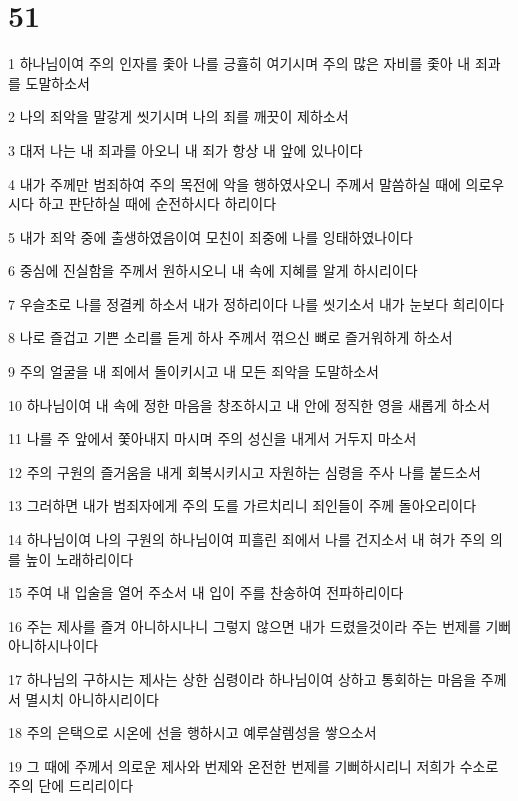 \chapter{51}

\par 1 하나님이여 주의 인자를 좇아 나를 긍휼히 여기시며 주의 많은 자비를 좇아 내 죄과를 도말하소서
\par 2 나의 죄악을 말갛게 씻기시며 나의 죄를 깨끗이 제하소서
\par 3 대저 나는 내 죄과를 아오니 내 죄가 항상 내 앞에 있나이다
\par 4 내가 주께만 범죄하여 주의 목전에 악을 행하였사오니 주께서 말씀하실 때에 의로우시다 하고 판단하실 때에 순전하시다 하리이다
\par 5 내가 죄악 중에 출생하였음이여 모친이 죄중에 나를 잉태하였나이다
\par 6 중심에 진실함을 주께서 원하시오니 내 속에 지혜를 알게 하시리이다
\par 7 우슬초로 나를 정결케 하소서 내가 정하리이다 나를 씻기소서 내가 눈보다 희리이다
\par 8 나로 즐겁고 기쁜 소리를 듣게 하사 주께서 꺾으신 뼈로 즐거워하게 하소서
\par 9 주의 얼굴을 내 죄에서 돌이키시고 내 모든 죄악을 도말하소서
\par 10 하나님이여 내 속에 정한 마음을 창조하시고 내 안에 정직한 영을 새롭게 하소서
\par 11 나를 주 앞에서 쫓아내지 마시며 주의 성신을 내게서 거두지 마소서
\par 12 주의 구원의 즐거움을 내게 회복시키시고 자원하는 심령을 주사 나를 붙드소서
\par 13 그러하면 내가 범죄자에게 주의 도를 가르치리니 죄인들이 주께 돌아오리이다
\par 14 하나님이여 나의 구원의 하나님이여 피흘린 죄에서 나를 건지소서 내 혀가 주의 의를 높이 노래하리이다
\par 15 주여 내 입술을 열어 주소서 내 입이 주를 찬송하여 전파하리이다
\par 16 주는 제사를 즐겨 아니하시나니 그렇지 않으면 내가 드렸을것이라 주는 번제를 기뻐 아니하시나이다
\par 17 하나님의 구하시는 제사는 상한 심령이라 하나님이여 상하고 통회하는 마음을 주께서 멸시치 아니하시리이다
\par 18 주의 은택으로 시온에 선을 행하시고 예루살렘성을 쌓으소서
\par 19 그 때에 주께서 의로운 제사와 번제와 온전한 번제를 기뻐하시리니 저희가 수소로 주의 단에 드리리이다

